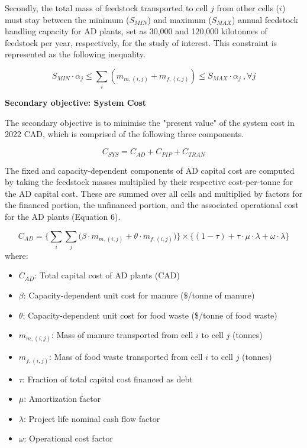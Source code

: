 \documentclass[12pt]{article}
\begin{document}
Secondly, the total mass of feedstock transported to cell $j$ from other cells ($i$) must stay between the minimum ($S_{MIN}$) and maximum ($S_{MAX}$) annual feedstock handling capacity for AD plants, set as 30,000 and 120,000 kilotonnes of feedstock per year, respectively, for the study of interest. This constraint is represented as the following inequality.

\begin{equation}
  S_{MIN} \cdot \alpha_j \leq \sum_{i} (m_{m, (i,j)} + m_{f, (i,j)}) \leq S_{MAX} \cdot \alpha_j \ , \forall j
\end{equation}

\textbf{Secondary objective: System Cost}

The secondary objective is to minimise the "present value" of the system cost in 2022 CAD, which is comprised of the following three components.

\begin{equation}
  C_{SYS} = C_{AD} + C_{PIP} + C_{TRAN}
\end{equation}

The fixed and capacity-dependent components of AD capital cost are computed by taking the feedstock masses multiplied by their respective cost-per-tonne for the AD capital cost. These are summed over all cells and multiplied by factors for the financed portion, the unfinanced portion, and the associated operational cost for the AD plants (Equation 6).

\begin{equation}
  C_{AD} = \biggl\{\sum_{i}\sum_{j} \bigl( \beta \cdot m_{m, (i,j)} + \theta \cdot m_{f, (i,j)} \bigr)\biggr\} \times \{(1 - \tau) + \tau \cdot \mu \cdot \lambda + \omega \cdot \lambda\}
\end{equation}
where:
\begin{itemize}
  \item $C_{AD}$: Total capital cost of AD plants (CAD)
  \item $\beta$: Capacity-dependent unit cost for manure (\$/tonne of manure)
  \item $\theta$: Capacity-dependent unit cost for food waste (\$/tonne of food waste)
  \item $m_{m, (i,j)}$: Mass of manure transported from cell $i$ to cell $j$ (tonnes)
  \item $m_{f, (i,j)}$: Mass of food waste transported from cell $i$ to cell $j$ (tonnes)
  \item $\tau$: Fraction of total capital cost financed as debt
  \item $\mu$: Amortization factor
  \item $\lambda$: Project life nominal cash flow factor
  \item $\omega$: Operational cost factor
\end{itemize}
\end{document}
